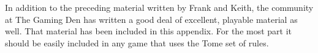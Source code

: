 \vspace*{-8pt}

In addition to the preceding material written by Frank and Keith, the community at The Gaming Den has written a good deal of excellent, playable material as well. That material has been included in this appendix. For the most part it should be easily included in any game that uses the Tome set of rules.

